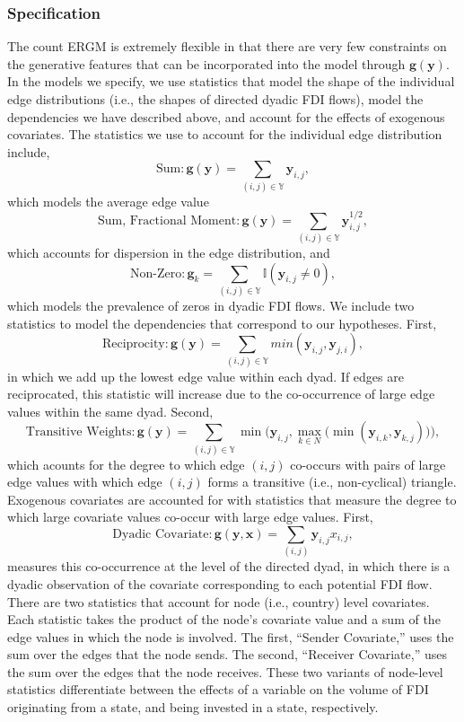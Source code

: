 \documentclass[reqno,onecolumn,letterpaper,12pt]{article}
\begin{document}
\subsubsection{Specification}


The count ERGM is extremely flexible in that there are very few constraints on the generative features that can be incorporated into the model through $\bm{g}( \bm{y} )$. In the models we specify, we use statistics that model the shape of the individual edge distributions (i.e., the shapes of directed dyadic FDI flows), model the dependencies we have described above, and account for the effects of exogenous covariates. The statistics we use to account for the individual edge distribution include, $$\text{Sum}:\bm{g(y)} = \sum_{(i,j) {\in} \mathbb{Y}}\bm{y}_{i,j},$$ which models the average edge value $$\text{Sum, Fractional Moment}:\bm{g(y)} = \sum_{(i,j) {\in} \mathbb{Y}}\bm{y}_{i,j}^{1/2},$$ which accounts for dispersion in the edge distribution, and
$$\text{Non-Zero}: \bm{g}_k = \sum_{(i,j) {\in} \mathbb{Y}} \mathbb{I}(\bm{y}_{i,j} \neq 0),$$ which models the prevalence of zeros in dyadic FDI flows. We include two statistics to model the dependencies that correspond to our hypotheses. First,
$$ \text{Reciprocity}: \bm{g(y)} = \sum_{(i,j) {\in} \mathbb{Y}}min(\bm{y}_{i,j},\bm{y}_{j,i}),$$ in which we add up the lowest edge value within each dyad. If edges are reciprocated, this statistic will increase due to the co-occurrence of large edge values within the same dyad. Second,
$$\text{Transitive Weights}: \bm{g(y)} =  \sum_{(i,j) {\in} \mathbb{Y}}\min\bigg( \bm{y}_{i,j}, \max\limits_{k{\in}N}\Big(\min(\bm{y}_{i,k},\bm{y}_{k,j})\Big) \bigg),$$ which acounts for the degree to which edge $(i,j)$ co-occurs with pairs of large edge values with which  edge $(i,j)$ forms a transitive (i.e., non-cyclical) triangle. Exogenous covariates are accounted for with statistics that measure the degree to which large covariate values co-occur with large edge values. First,
$$ \text{Dyadic Covariate}: \bm{g(y,x)} = \sum_{(i,j)} \bm{y}_{i,j}x_{i,j},$$ measures this co-occurrence at the level of the directed dyad, in which there is a dyadic observation of the covariate corresponding to each potential FDI flow. There are two statistics that account for node (i.e., country) level covariates. Each statistic takes the product of the node's covariate value and a sum of the edge values in which the node is involved. The first, ``Sender Covariate,'' uses the sum over the edges that the node sends. The second, ``Receiver Covariate,'' uses the sum over the edges that the node receives. These two variants of node-level statistics differentiate between the effects of a variable on the volume of FDI originating from a state, and being invested in a state, respectively.
\end{document}
